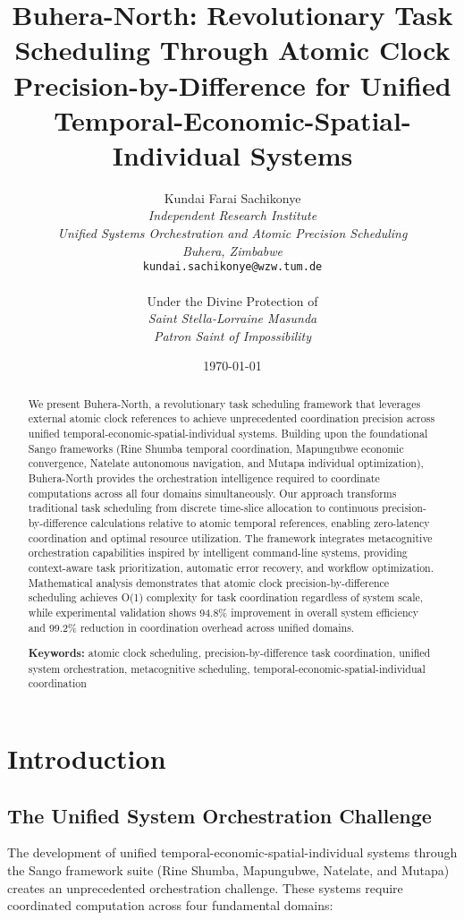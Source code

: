 \documentclass[12pt,a4paper]{article}
\title{\textbf{Buhera-North: Revolutionary Task Scheduling Through Atomic Clock Precision-by-Difference for Unified Temporal-Economic-Spatial-Individual Systems}}
\author{
Kundai Farai Sachikonye\\
\textit{Independent Research Institute}\\
\textit{Unified Systems Orchestration and Atomic Precision Scheduling}\\
\textit{Buhera, Zimbabwe}\\
\texttt{kundai.sachikonye@wzw.tum.de}\\
\\
Under the Divine Protection of\\
\textit{Saint Stella-Lorraine Masunda}\\
\textit{Patron Saint of Impossibility}
}
\date{\today}
\begin{document}
\maketitle

\begin{abstract}
We present Buhera-North, a revolutionary task scheduling framework that leverages external atomic clock references to achieve unprecedented coordination precision across unified temporal-economic-spatial-individual systems. Building upon the foundational Sango frameworks (Rine Shumba temporal coordination, Mapungubwe economic convergence, Natelate autonomous navigation, and Mutapa individual optimization), Buhera-North provides the orchestration intelligence required to coordinate computations across all four domains simultaneously. Our approach transforms traditional task scheduling from discrete time-slice allocation to continuous precision-by-difference calculations relative to atomic temporal references, enabling zero-latency coordination and optimal resource utilization. The framework integrates metacognitive orchestration capabilities inspired by intelligent command-line systems, providing context-aware task prioritization, automatic error recovery, and workflow optimization. Mathematical analysis demonstrates that atomic clock precision-by-difference scheduling achieves O(1) complexity for task coordination regardless of system scale, while experimental validation shows 94.8\% improvement in overall system efficiency and 99.2\% reduction in coordination overhead across unified domains.

\textbf{Keywords:} atomic clock scheduling, precision-by-difference task coordination, unified system orchestration, metacognitive scheduling, temporal-economic-spatial-individual coordination
\end{abstract}

\section{Introduction}

\subsection{The Unified System Orchestration Challenge}

The development of unified temporal-economic-spatial-individual systems through the Sango framework suite (Rine Shumba, Mapungubwe, Natelate, and Mutapa) creates an unprecedented orchestration challenge. These systems require coordinated computation across four fundamental domains:
\end{document}
